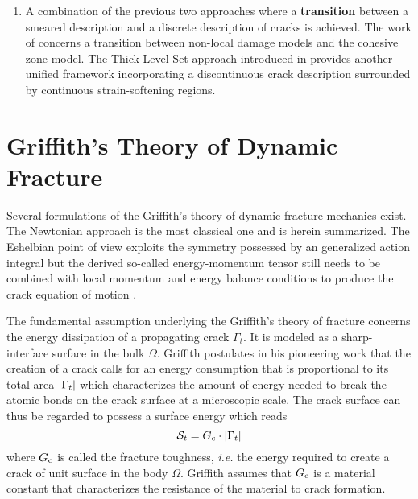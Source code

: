 \begin{enumerate}
\item A combination of the previous two approaches where a \textbf{transition} between a smeared description and a discrete description of cracks is achieved. The work of \cite{BorstRemmersNeedlemanAbellan:2004,CazesCoretCombescureGravouil:2009,CuvilliezFeyelLorentzMichel-Ponnelle:2012} concerns a transition between non-local damage models and the cohesive zone model. The Thick Level Set approach introduced in \cite{MoesStolzBernardChevaugeon:2011,MoreauMoesPicartStainier:2015} provides another unified framework incorporating a discontinuous crack description surrounded by continuous strain-softening regions.
\end{enumerate}

\section{Griffith's Theory of Dynamic Fracture} \label{sec:griffithfreund}
Several formulations of the Griffith's theory of dynamic fracture mechanics exist. The Newtonian approach \cite{Freund:1990} is the most classical one and is herein summarized. The Eshelbian point of view \cite{Eshelby:1975} exploits the symmetry possessed by an generalized action integral but the derived so-called energy-momentum tensor still needs to be combined with local momentum and energy balance conditions to produce the crack equation of motion \cite{Maugin:1994,Adda-BediaAriasAmarLund:1999}.

The fundamental assumption underlying the Griffith's theory of fracture concerns the energy dissipation of a propagating crack $\Gamma_t$. It is modeled as a sharp-interface surface in the bulk $\Omega$. Griffith postulates in his pioneering work \cite{Griffith:1921} that the creation of a crack calls for an energy consumption that is proportional to its total area $\left\lvert{\Gamma_t}\right\rvert$ which characterizes the amount of energy needed to break the atomic bonds on the crack surface at a microscopic scale. The crack surface can thus be regarded to possess a surface energy which reads
\begin{equation} \label{eq:StGriffith}
\mathcal{S}_t=G_\mathrm{c}\cdot\left\lvert{\Gamma_t}\right\rvert
\end{equation}
where $G_\mathrm{c}$ is called the fracture toughness, \emph{i.e.} the energy required to create a crack of unit surface in the body $\Omega$. Griffith assumes that $G_\mathrm{c}$ is a material constant that characterizes the resistance of the material to crack formation.

